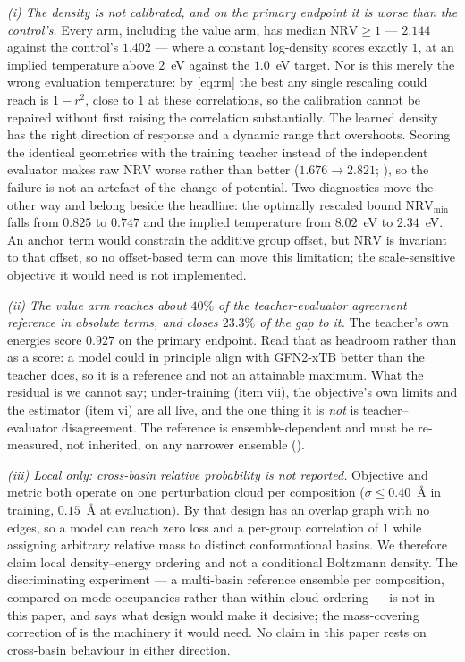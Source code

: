\emph{(i) The density is not calibrated, and on the primary endpoint it is worse than
the control's.} Every arm, including the value arm, has median $\mathrm{NRV} \ge 1$ ---
$2.144$ against the control's $1.402$ --- where a constant log-density scores exactly
$1$, at an implied temperature above $2$~eV against the $1.0$~eV target. Nor is this
merely the wrong evaluation temperature: by \eqref{eq:rm} the best any single
rescaling could reach is $1 - r^2$, close to $1$ at these correlations, so the
calibration cannot be repaired without first raising the correlation substantially.
The learned density has the right direction of response and a dynamic range that
overshoots. Scoring the identical geometries with the training teacher instead of the
independent evaluator makes raw $\mathrm{NRV}$ worse rather than better
($1.676 \to 2.821$; ), so the failure is not an artefact of the
change of potential. Two diagnostics move the other way and belong beside the headline: the
optimally rescaled bound $\mathrm{NRV}_{\min}$ falls from $0.825$ to $0.747$ and the
implied temperature from $8.02$~eV to $2.34$~eV. An anchor term would constrain the
additive group offset, but $\mathrm{NRV}$ is invariant to that offset, so no
offset-based term can move this limitation; the scale-sensitive objective it would
need is not implemented.

\emph{(ii) The value arm reaches about $40\%$ of the teacher-evaluator agreement reference in
absolute terms, and closes $23.3\%$ of the gap to it.} The teacher's own energies
score $0.927$ on the primary endpoint. Read that as headroom rather than as a score:
a model could in principle align with GFN2-xTB better than the teacher does, so it is
a reference and not an attainable maximum. What the residual is we cannot say;
under-training (item vii), the objective's own limits and the estimator
(item vi) are all live, and the one thing it is \emph{not} is teacher--evaluator
disagreement. The reference is ensemble-dependent and must be re-measured, not
inherited, on any narrower ensemble ().

\emph{(iii) Local only: cross-basin relative probability is not reported.} Objective
and metric both operate on one perturbation cloud per composition
($\sigma \le 0.40$~\AA{} in training, $0.15$~\AA{} at evaluation). By
 that design has an overlap graph with no edges, so a model
can reach zero loss and a per-group correlation of $1$ while assigning arbitrary
relative mass to distinct conformational basins. We therefore claim local
density--energy ordering and not a conditional Boltzmann density. The discriminating
experiment --- a multi-basin reference ensemble per composition, compared on mode
occupancies rather than within-cloud ordering --- is not in this paper, and
 says what design would make it decisive; the mass-covering correction
of \citet{fab} is the machinery it would need. No claim in this paper rests on
cross-basin behaviour in either direction.

